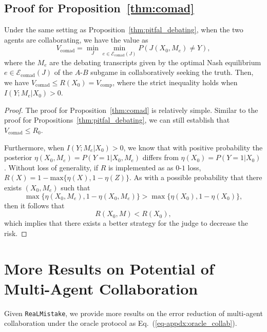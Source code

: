 \documentclass{article} %
\newcommand{\real}[0]{\texttt{ReaLMistake}\xspace}
\begin{document}
\subsection{Proof for Proposition~\ref{thm:comad}}
\label{proof:comad}
\begin{proposition}%
    Under the same setting as Proposition~\ref{thm:pitfal_debating}, when the two agents are collaborating, we have the value as
    \[
    V_\mathrm{comad}=\min_J\min_{e\in\mathcal{E}_\mathrm{comad}(J)}P(J(X_0,M_e)\neq Y),
    \]
    where the $M_e$ are the debating transcripts given by the optimal Nash equilibrium $e\in\mathcal{E}_\mathrm{comad}(J)$ of the $A$-$B$ subgame in collaboratively seeking the truth. Then, we have $V_\mathrm{comad}\leq R(X_0)=V_\textrm{comp}$, where the strict inequality holds when $I(Y;M_e|X_0)>0$.
\end{proposition}
\begin{proof}
    The proof for Proposition~\ref{thm:comad} is relatively simple. Similar to the proof for Propositions~\ref{thm:pitfal_debating}, we can still establish that $V_\mathrm{comad}\leq R_0$.

    Furthermore, when $I(Y;M_e|X_0)>0$, we know that with positive probability the posterior $\eta(X_0,M_e)=P(Y=1|X_0,M_e)$ differs from $\eta(X_0)=P(Y=1|X_0)$. Without loss of generality, if $R$ is implemented as as $0$-$1$ loss, $R(X)=1-\mathrm{max}\{\eta(X),1-\eta(Z)\}$. As with a possible probability that there exists $(X_0,M_e)$ such that 
    \begin{equation}
        \max\{\eta(X_0,M_e),1-\eta(X_0,M_e)\}>\max\{\eta(X_0),1-\eta(X_0)\},
    \end{equation}
    then it follows that
    \begin{equation}
        R(X_0,M)<R(X_0),
    \end{equation}
    which implies that there exists a better strategy for the judge to decrease the risk.
\end{proof}

\section{More Results on Potential of Multi-Agent Collaboration}\label{appdx:potential}

Given \real, we provide more results on the error reduction of multi-agent collaboration under the oracle protocol as Eq.~(\ref{eq-appdx:oracle_collab}).
\end{document}
